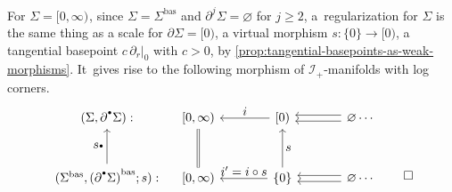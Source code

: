 \documentclass[10pt]{amsart}
\let\oldbullet\bullet
\renewcommand{\bullet}{{\raisebox{1pt}{$\scriptscriptstyle\oldbullet$}}}
\let\tst\textstyle
\theoremstyle{definition}
\theoremstyle{remark}
\newenvironment{example}
  {\pushQED{\qed}\renewcommand{\qedsymbol}{$\lozenge$}\examplex}
  {\popQED\endexamplex}
\newcommand{\halfspc}[1]{[0,\infty)^{#1}}
\renewcommand{\ge}{\geqslant}
\newcommand{\Sig}{\Sigma}
\newcommand{\bas}[1]{{#1}^{\mathrm{bas}}}
\newcommand{\Sigbas}{\bas{\Sig}}
\newcommand{\bdSig}[1][]{\partial^{#1}\Sigma}
\newcommand{\ascat}{\mathscr{I}_+}
\begin{document}
\begin{example}
For $\Sig=\halfspc{}$, since $\Sig=\Sigbas$ and $\partial^j\Sig=\varnothing$ for $j\ge 2$, a~regularization for $\Sig$ is the same thing as a scale for $\partial\Sig=[0)$, \ie a virtual morphism $s:\{0\}\to [0)$, \ie a tangential basepoint $c\,\partial_r|_0$ with $c>0$, by \autoref{prop:tangential-basepoints-as-weak-morphisms}. It~gives rise to the following morphism of $\ascat$-manifolds with log corners.
\[
\begin{tikzcd}[row sep = 1cm,baseline=-0.9cm]
(\Sig,\partial^\bullet\Sig): &[-.5cm] {[0,\infty)} &[.5cm] {[0)} \ar[l,"\tst i"'] &[.4cm] \varnothing \ar[l,shift left] \ar[l,shift right] \cdots \\
(\Sigbas,\bas{(\bdSig[\bullet])};s): \ar[u,"\tst s_\bullet"]& {[0,\infty)} \ar[u,equal] & \{0\} \ar[l,"\tst i'=i\circ s"']\ar[u,"\tst s"'] & \varnothing \ar[l,shift left] \ar[l,shift right] \cdots
\end{tikzcd}\qedhere
\]
\end{example}
\end{document}
